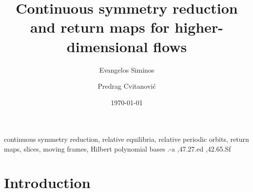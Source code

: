 \documentclass[preprint,number,sort&compress]{elsarticle}
\begin{document}
\begin{frontmatter}

			\title{
Continuous symmetry reduction and return maps for higher-dimensional flows
			}
\author{Evangelos Siminos}
\author{Predrag Cvitanovi\'c}
\address{Center for Nonlinear Science,
School of Physics, Georgia Institute of Technology,
Atlanta, GA 30332-0430}


\date{\today}

        \begin{abstract}

        \end{abstract}

\begin{keyword}
continuous symmetry reduction,
relative equilibria,
relative periodic orbits,
return maps,
slices,
moving frames,
Hilbert polynomial bases
.-a \sep 47.27.ed \sep 42.65.Sf
\end{keyword}
\end{frontmatter}

\section{\label{s:intro} Introduction}
    

    

    
\end{document}
